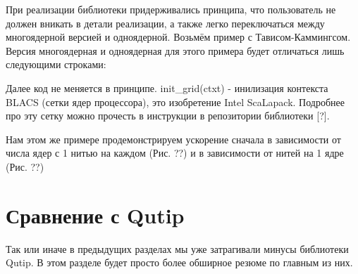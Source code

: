 \documentclass[aps,twocolumn,pra,showpacs,amsmath,amssymb,showkeys,10pt]{revtex4-2}
\begin{document}
    При реализации библиотеки придерживались принципа, что пользователь не должен вникать в детали реализации, а также легко переключаться между многоядерной версией и одноядерной. Возьмём пример с 
    Тависом-Каммингсом. Версия многоядерная и одноядерная для этого примера будет отличаться лишь следующими строками:

    Далее код не меняется в принципе. init\_grid(ctxt) - инилизация контекста BLACS (сетки ядер процессора), это изобретение Intel ScaLapack. Подробнее про эту сетку можно прочесть в инструкции 
    в репозитории библиотеки [?].

    Нам этом же примере продемонстрируем ускорение сначала в зависимости от числа ядер с 1 нитью на каждом (Рис. ??) и в зависимости от нитей на 1 ядре (Рис. ??)

    \section{Сравнение с Qutip}
    Так или иначе в предыдущих разделах мы уже затрагивали минусы библиотеки Qutip. В этом разделе будет просто более обширное резюме по главным из них.
\end{document}
